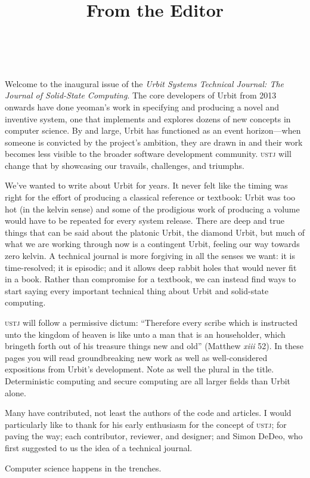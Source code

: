 \documentclass[twoside]{article}
\title{From the Editor}
\author{\authorname~\authorpatp \\ \affiliation}
\date{}
\begin{document}
\thispagestyle{firststyle}

\setcounter{page}{1}

Welcome to the inaugural issue of the \emph{Urbit Systems Technical Journal:  The Journal of Solid-State Computing}.  The core developers of Urbit from 2013 onwards have done yeoman's work in specifying and producing a novel and inventive system, one that implements and explores dozens of new concepts in computer science.  By and large, Urbit has functioned as an event horizon—when someone is convicted by the project's ambition, they are drawn in and their work becomes less visible to the broader software development community.  \textsc{ustj} will change that by showcasing our travails, challenges, and triumphs.

We've wanted to write about Urbit for years.  It never felt like the timing was right for the effort of producing a classical reference or textbook:  Urbit was too hot (in the kelvin sense) and some of the prodigious work of producing a volume would have to be repeated for every system release.  There are deep and true things that can be said about the platonic Urbit, the diamond Urbit, but much of what we are working through now is a contingent Urbit, feeling our way towards zero kelvin.  A technical journal is more forgiving in all the senses we want:  it is time-resolved; it is episodic; and it allows deep rabbit holes that would never fit in a book.  Rather than compromise for a textbook, we can instead find ways to start saying every important technical thing about Urbit and solid-state computing.

\textsc{ustj} will follow a permissive dictum:  “Therefore every \linebreak scribe which is instructed unto the kingdom of heaven is like unto a man that is an householder, which bringeth forth out of his treasure things new and old” (Matthew \emph{xiii} 52).  In these pages you will read groundbreaking new work as well as well-considered expositions from Urbit's development.  Note as well the plural in the title.  Deterministic computing and secure computing are all larger fields than Urbit alone.

Many have contributed, not least the authors of the code and articles.  I would particularly like to thank  for his early enthusiasm for the concept of \textsc{ustj};  for paving the way; each contributor, reviewer, and designer; and Simon DeDeo, who first suggested to us the idea of a technical journal.

Computer science happens in the trenches.  \tombstone{}
\end{document}
